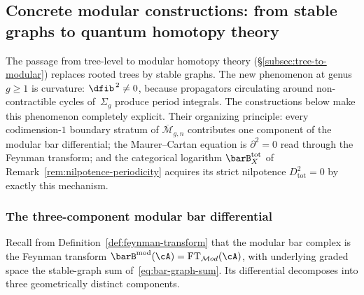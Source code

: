 \subsection{Concrete modular constructions: from stable graphs to quantum homotopy theory}
\label{subsec:concrete-modular-constructions}

The passage from tree-level to modular homotopy theory
(\S\ref{subsec:tree-to-modular}) replaces rooted trees by stable
graphs.  The new phenomenon at genus $g \geq 1$ is curvature:
$\dfib^{\,2} \neq 0$, because propagators circulating around
non-contractible cycles of~$\Sigma_g$ produce period integrals.  The
constructions below make this phenomenon completely explicit.  Their
organizing principle: every codimension-$1$ boundary stratum of
$\overline{\mathcal{M}}_{g,n}$ contributes one component of the
modular bar differential; the Maurer--Cartan equation is $\partial^2
= 0$ read through the Feynman transform; and the categorical
logarithm $\barB^{\mathrm{tot}}_X$ of
Remark~\ref{rem:nilpotence-periodicity} acquires its strict
nilpotence $D_{\mathrm{tot}}^2 = 0$ by exactly this mechanism.

\subsubsection{The three-component modular bar differential}
\label{subsubsec:three-component-differential}

Recall from Definition~\ref{def:feynman-transform} that the modular bar
complex is the Feynman transform
$\barB^{\mathrm{mod}}(\cA) = \mathrm{FT}_{\mathcal{M}od}(\cA)$,
with underlying graded space the stable-graph sum
of~\eqref{eq:bar-graph-sum}.  Its differential decomposes into three
geometrically distinct components.

